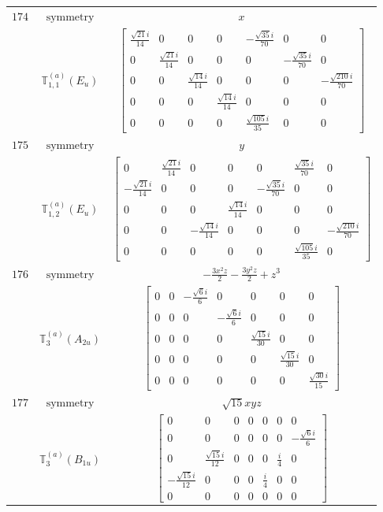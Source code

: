 \documentclass[fleqn,8pt,landscape]{jsarticle}
\begin{document}
\begin{longtable}{ccc}
$ 174 $ & $ \text{symmetry} $ & $ x $ \\
$  $ & $ \mathbb{T}_{1,1}^{(a)}(E_{u}) $ & $ \begin{bmatrix} \frac{\sqrt{21} i}{14} & 0 & 0 & 0 & - \frac{\sqrt{35} i}{70} & 0 & 0 \\ 0 & \frac{\sqrt{21} i}{14} & 0 & 0 & 0 & - \frac{\sqrt{35} i}{70} & 0 \\ 0 & 0 & \frac{\sqrt{14} i}{14} & 0 & 0 & 0 & - \frac{\sqrt{210} i}{70} \\ 0 & 0 & 0 & \frac{\sqrt{14} i}{14} & 0 & 0 & 0 \\ 0 & 0 & 0 & 0 & \frac{\sqrt{105} i}{35} & 0 & 0 \end{bmatrix} $ \\ \hline
$ 175 $ & $ \text{symmetry} $ & $ y $ \\
$  $ & $ \mathbb{T}_{1,2}^{(a)}(E_{u}) $ & $ \begin{bmatrix} 0 & \frac{\sqrt{21} i}{14} & 0 & 0 & 0 & \frac{\sqrt{35} i}{70} & 0 \\ - \frac{\sqrt{21} i}{14} & 0 & 0 & 0 & - \frac{\sqrt{35} i}{70} & 0 & 0 \\ 0 & 0 & 0 & \frac{\sqrt{14} i}{14} & 0 & 0 & 0 \\ 0 & 0 & - \frac{\sqrt{14} i}{14} & 0 & 0 & 0 & - \frac{\sqrt{210} i}{70} \\ 0 & 0 & 0 & 0 & 0 & \frac{\sqrt{105} i}{35} & 0 \end{bmatrix} $ \\ \hline
$ 176 $ & $ \text{symmetry} $ & $ - \frac{3 x^{2} z}{2} - \frac{3 y^{2} z}{2} + z^{3} $ \\
$  $ & $ \mathbb{T}_{3}^{(a)}(A_{2u}) $ & $ \begin{bmatrix} 0 & 0 & - \frac{\sqrt{6} i}{6} & 0 & 0 & 0 & 0 \\ 0 & 0 & 0 & - \frac{\sqrt{6} i}{6} & 0 & 0 & 0 \\ 0 & 0 & 0 & 0 & \frac{\sqrt{15} i}{30} & 0 & 0 \\ 0 & 0 & 0 & 0 & 0 & \frac{\sqrt{15} i}{30} & 0 \\ 0 & 0 & 0 & 0 & 0 & 0 & \frac{\sqrt{30} i}{15} \end{bmatrix} $ \\ \hline
$ 177 $ & $ \text{symmetry} $ & $ \sqrt{15} x y z $ \\
$  $ & $ \mathbb{T}_{3}^{(a)}(B_{1u}) $ & $ \begin{bmatrix} 0 & 0 & 0 & 0 & 0 & 0 & 0 \\ 0 & 0 & 0 & 0 & 0 & 0 & - \frac{\sqrt{6} i}{6} \\ 0 & \frac{\sqrt{15} i}{12} & 0 & 0 & 0 & \frac{i}{4} & 0 \\ - \frac{\sqrt{15} i}{12} & 0 & 0 & 0 & \frac{i}{4} & 0 & 0 \\ 0 & 0 & 0 & 0 & 0 & 0 & 0 \end{bmatrix} $ \\ \hline

\end{longtable}
\end{document}
